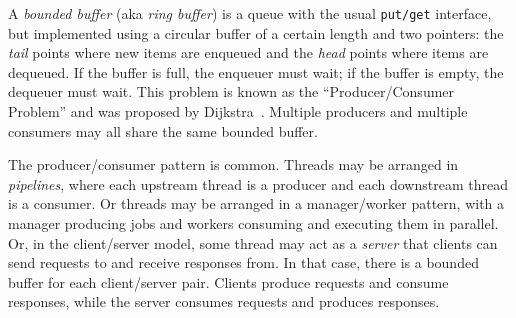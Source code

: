 \documentclass{report}
\begin{document}
%
A \emph{bounded buffer} (aka \emph{ring buffer}) is
a queue with the usual \texttt{put/get} interface,
but implemented using a circular buffer
%
of a certain length and two pointers:
the \emph{tail} points where new items are enqueued and the \emph{head}
points where items are dequeued.
If the buffer is full, the enqueuer must wait; if the buffer is empty, the
dequeuer must wait.
This problem is known as the ``Producer/Consumer Problem'' and was
proposed by Dijkstra~\cite{EWD329}.
Multiple producers and multiple consumers may all share
the same bounded buffer.

The producer/consumer pattern is common.  Threads may be arranged
in \emph{pipelines},
%
where each upstream thread is a producer and each downstream
thread is a consumer.
Or threads may be arranged in a manager/worker pattern, with a manager
producing jobs and workers consuming and executing them in parallel.
Or, in the client/server model,
%
some thread may act as a \emph{server} that clients can send requests to
and receive responses from.  In that case, there is a bounded buffer
for each client/server pair. Clients produce requests and
consume responses, while the server consumes requests and produces responses.
\end{document}
